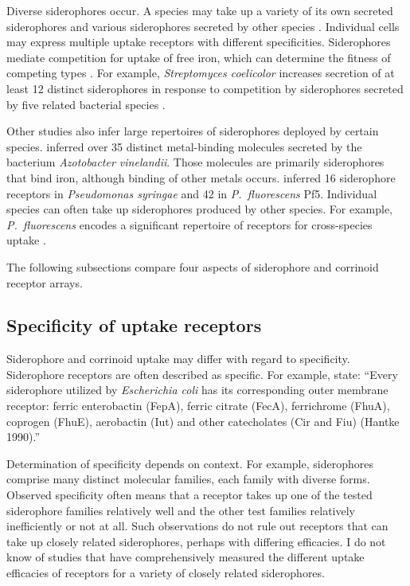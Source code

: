 \documentclass[\mydocfontsize]{article}
\begin{document}
\begin{multicols}{2}
Diverse siderophores occur. A species may take up a variety of its own secreted siderophores and various siderophores secreted by other species \autocite{cornelis02diversity,chakraborty13iron}. Individual cells may express multiple uptake receptors with different specificities. Siderophores mediate competition for uptake of free iron, which can determine the fitness of competing types \autocite{hibbing10bacterial}. For example, \textit{Streptomyces coelicolor} increases secretion of at least 12 distinct siderophores in response to competition by siderophores secreted by five related bacterial species \autocite{traxler13interspecies}.

Other studies also infer large repertoires of siderophores deployed by certain species. \textcite{baars16the-siderophore} inferred over 35 distinct metal-binding molecules secreted by the bacterium \textit{Azotobacter vinelandii}. Those molecules are primarily siderophores that bind iron, although binding of other metals occurs. \textcite{cornelis09a-survey} inferred 16 siderophore receptors in \textit{Pseudomonas syringae} and 42 in \textit{P.\ fluorescens} Pf5. Individual species can often take up siderophores produced by other species. For example, \textit{P.\ fluorescens} encodes a significant repertoire of receptors for cross-species uptake \autocite{cornelis02diversity}.

The following subsections compare four aspects of siderophore and corrinoid receptor arrays.

\subsection{Specificity of uptake receptors} 

Siderophore and corrinoid uptake may differ with regard to specificity. Siderophore receptors are often described as specific. For example, \textcite{rabsch91the-specificity} state: ``Every siderophore utilized by \textit{Escherichia coli} has its corresponding outer membrane receptor: ferric enterobactin (FepA), ferric citrate (FecA), ferrichrome (FhuA), coprogen (FhuE), aerobactin (Iut) and other catecholates (Cir and Fiu) (Hantke 1990).''\nocite{hantke90dihydroxybenzolyserine} 

Determination of specificity depends on context. For example, siderophores comprise many distinct molecular families, each family with diverse forms. Observed specificity often means that a receptor takes up one of the tested siderophore families relatively well and the other test families relatively inefficiently or not at all. Such observations do not rule out receptors that can take up closely related siderophores, perhaps with differing efficacies. I do not know of studies that have comprehensively measured the different uptake efficacies of receptors for a variety of closely related siderophores.


\end{multicols}
\end{document}
